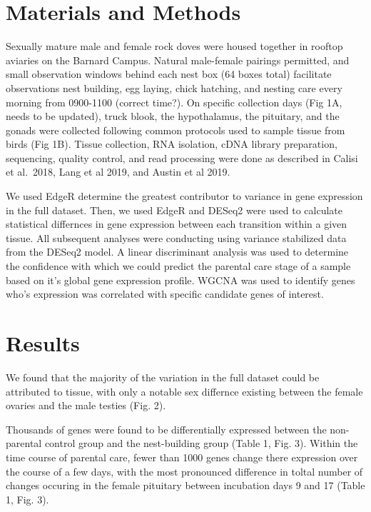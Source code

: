 \documentclass[10pt,letterpaper]{article}
\begin{document}
\hypertarget{materials-and-methods}{%
\section{Materials and Methods}\label{materials-and-methods}}

Sexually mature male and female rock doves were housed together in
rooftop aviaries on the Barnard Campus. Natural male-female pairings
permitted, and small observation windows behind each nest box (64 boxes
total) facilitate observations nest building, egg laying, chick
hatching, and nesting care every morning from 0900-1100 (correct time?).
On specific collection days (Fig 1A, needs to be updated), truck blook,
the hypothalamus, the pituitary, and the gonads were collected following
common protocols used to sample tissue from birds (Fig 1B). Tissue
collection, RNA isolation, cDNA library preparation, sequencing, quality
control, and read processing were done as described in Calisi et
al.~2018, Lang et al 2019, and Austin et al 2019.

We used EdgeR determine the greatest contributor to variance in gene
expression in the full dataset. Then, we used EdgeR and DESeq2 were used
to calculate statistical differnces in gene expression between each
transition within a given tissue. All subsequent analyses were
conducting using variance stabilized data from the DESeq2 model. A
linear discriminant analysis was used to determine the confidence with
which we could predict the parental care stage of a sample based on it's
global gene expression profile. WGCNA was used to identify genes who's
expression was correlated with specific candidate genes of interest.

\hypertarget{results}{%
\section{Results}\label{results}}

We found that the majority of the variation in the full dataset could be
attributed to tissue, with only a notable sex differnce existing between
the female ovaries and the male testies (Fig. 2).

Thousands of genes were found to be differentially expressed between the
non-parental control group and the nest-building group (Table 1, Fig.
3). Within the time course of parental care, fewer than 1000 genes
change there expression over the course of a few days, with the most
pronounced difference in toltal number of changes occuring in the female
pituitary between incubation days 9 and 17 (Table 1, Fig. 3).
\end{document}
